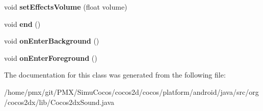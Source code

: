 \begin{DoxyCompactItemize}
\item 
\mbox{\label{classorg_1_1cocos2dx_1_1lib_1_1Cocos2dxSound_ad54a76c1ea196a0d668eb3b041f564c6}} 
void {\bfseries set\+Effects\+Volume} (float volume)
\item 
\mbox{\label{classorg_1_1cocos2dx_1_1lib_1_1Cocos2dxSound_a5459f320146c0e5d65ab26a50b695f1d}} 
void {\bfseries end} ()
\item 
\mbox{\label{classorg_1_1cocos2dx_1_1lib_1_1Cocos2dxSound_a2fc9fb27ceb4d1cb5d6cb58dcc5c5f5d}} 
void {\bfseries on\+Enter\+Background} ()
\item 
\mbox{\label{classorg_1_1cocos2dx_1_1lib_1_1Cocos2dxSound_af954bfe1a6882aef7289934ec9a3c791}} 
void {\bfseries on\+Enter\+Foreground} ()
\end{DoxyCompactItemize}


The documentation for this class was generated from the following file\+:\begin{DoxyCompactItemize}
\item 
/home/pmx/git/\+P\+M\+X/\+Simu\+Cocos/cocos2d/cocos/platform/android/java/src/org/cocos2dx/lib/Cocos2dx\+Sound.\+java\end{DoxyCompactItemize}
